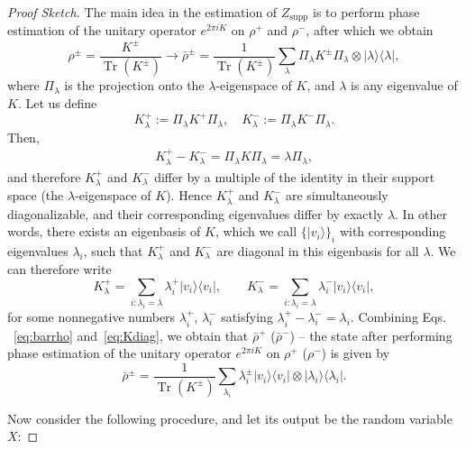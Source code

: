 \documentclass[a4paper,UKenglish,cleveref, autoref]{lipics-v2019}
\theoremstyle{remark}
\numberwithin{equation}{section}
\numberwithin{oracle}{section}
\numberwithin{remark}{section}
\newcommand{\ket}[1]{|#1\rangle}
\newcommand{\bra}[1]{\langle#1|}
\DeclareMathOperator{\tr}{Tr}
\begin{document}
\begin{proof}[Proof Sketch]
The main idea in the estimation of $Z_{\text{supp}}$ is to perform phase estimation of the unitary operator $e^{2 \pi iK}$ on $\rho^+$ and $\rho^-$, after which we obtain
\begin{equation}\label{eq:barrho}
\rho^\pm=\frac{K^\pm }{ \tr(K^\pm)}\rightarrow \bar{\rho}^\pm=\frac{1}{ \tr(K^\pm)}\sum_{\lambda} \Pi_\lambda K^\pm \Pi_\lambda\otimes\ket{\lambda}\bra{\lambda},
\end{equation}
where $\Pi_\lambda$ is the projection onto the $\lambda$-eigenspace of $K$, and $\lambda$ is any eigenvalue of $K$. Let us define
\begin{equation}\label{eq:Klambda}
K^+_\lambda := \Pi_\lambda K^+ \Pi_\lambda, \quad K^-_\lambda := \Pi_\lambda K^- \Pi_\lambda.
\end{equation}
Then,
\begin{align}\label{eq:Kdiff}
K^+_\lambda - K^-_\lambda = \Pi_\lambda K \Pi_\lambda = \lambda \Pi_\lambda,
\end{align}
and therefore $K^+_\lambda$ and $K^-_\lambda$ differ by a multiple of the identity in their support space (the $\lambda$-eigenspace of $K$). Hence $K^+_\lambda$ and $K^-_\lambda$ are simultaneously diagonalizable, and their corresponding eigenvalues differ by exactly $\lambda$. In other words, there exists an eigenbasis of $K$, which we call $\{\ket{v_i}\}_i$ with corresponding eigenvalues $\lambda_i$, such that $K^+_{\lambda}$ and $K^-_{\lambda}$ are diagonal in this eigenbasis for all $\lambda$. We can therefore write
\begin{equation}\label{eq:Kdiag}
K^+_\lambda = \sum_{i: \lambda_i = \lambda} \lambda^+_i \ket{v_i}\bra{v_i}, \quad \quad
K^-_\lambda = \sum_{i: \lambda_i = \lambda} \lambda^-_i \ket{v_i}\bra{v_i},
\end{equation}
for some nonnegative numbers $\lambda^+_i$, $\lambda^-_i$ satisfying $\lambda^+_i - \lambda^-_i = \lambda_i$. Combining Eqs. ~\eqref{eq:barrho} and~\eqref{eq:Kdiag}, we obtain that $\bar{\rho}^+$ ($\bar{\rho}^-$) -- the state after performing phase estimation of the unitary operator $e^{2 \pi iK}$ on $\rho^+$ ($\rho^-$) is given by
\begin{equation}\label{eq:barrho2}
\bar{\rho}^\pm=\frac{1}{ \tr(K^\pm)}\sum_{\lambda_i} \lambda^{\pm}_i \ket{v_i}\bra{v_i}\otimes\ket{\lambda_i}\bra{\lambda_i}.
\end{equation}

Now consider the following procedure, and let its output be the random variable $X$:


\end{proof}
\end{document}

